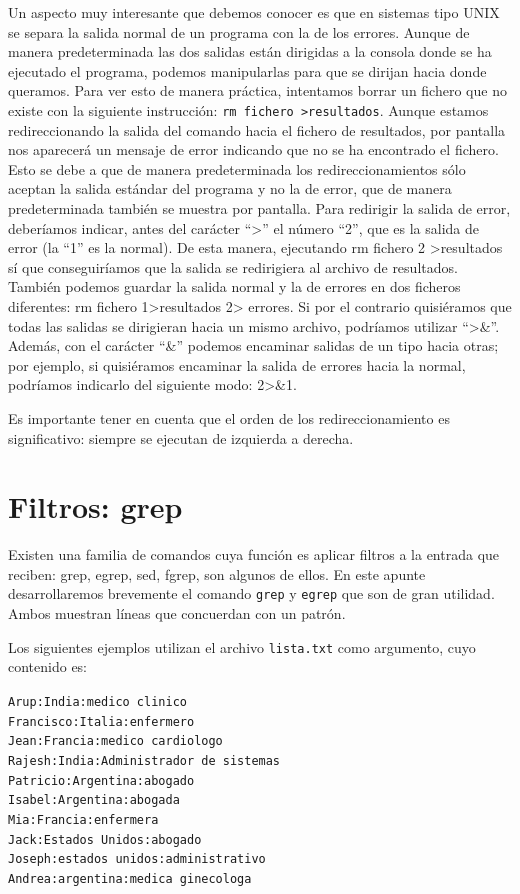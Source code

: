 \documentclass[12pt]{article}
\begin{document}
Un aspecto muy interesante que debemos conocer es que en sistemas tipo UNIX 
se separa la salida normal de un programa con la de los errores. Aunque de  
manera predeterminada las dos salidas están dirigidas a la consola donde 
se ha ejecutado el programa, podemos manipularlas para que se dirijan hacia 
donde queramos. Para ver esto de manera práctica, intentamos borrar un fichero 
que no existe con la siguiente instrucción: \texttt{rm fichero \textgreater resultados}. Aunque 
estamos redireccionando la salida del comando hacia el fichero de resultados, 
por pantalla nos aparecerá un mensaje de error indicando que no se ha encontrado 
el fichero. Esto se debe a que de manera predeterminada los redireccionamientos sólo aceptan 
la salida estándar del programa y no la de error, que de manera predeterminada también se 
muestra por pantalla. Para redirigir la salida de error, deberíamos indicar, 
antes del carácter ``\textgreater'' el número ``2'', que es la salida de error (la ``1'' es la 
normal). De esta manera, ejecutando rm fichero 2 \textgreater resultados sí que conseguiríamos
que la salida se redirigiera al archivo de resultados. También podemos guardar 
la salida normal y la de errores en dos ficheros diferentes: rm fichero 1\textgreater resultados 2\textgreater 
errores. Si por el contrario quisiéramos que todas las salidas se dirigieran
 hacia un mismo archivo, podríamos utilizar ``\textgreater\&''. Además, con el carácter ``\&'' 
podemos encaminar salidas de un tipo hacia otras; por ejemplo, si quisiéramos 
encaminar la salida de errores hacia la normal, podríamos indicarlo del 
siguiente modo: 2\textgreater\&1.

Es importante tener en cuenta que el orden de los redireccionamiento es 
significativo: siempre se ejecutan de izquierda a derecha.

\section{Filtros: grep}
Existen una familia de comandos cuya función es aplicar filtros a la entrada que 
reciben: grep, egrep, sed, fgrep, son algunos de ellos. En este apunte desarrollaremos brevemente el 
comando \texttt{grep} y \texttt{egrep} que son de gran utilidad. Ambos muestran 
líneas que concuerdan con un patrón. 

Los siguientes ejemplos utilizan el archivo \texttt{lista.txt} como argumento, cuyo 
contenido es: 

\texttt{Arup:India:medico clinico \\
Francisco:Italia:enfermero \\
Jean:Francia:medico cardiologo \\
Rajesh:India:Administrador de sistemas \\
Patricio:Argentina:abogado\\
Isabel:Argentina:abogada\\
Mia:Francia:enfermera\\
Jack:Estados Unidos:abogado\\
Joseph:estados unidos:administrativo\\
Andrea:argentina:medica ginecologa
}
\end{document}
